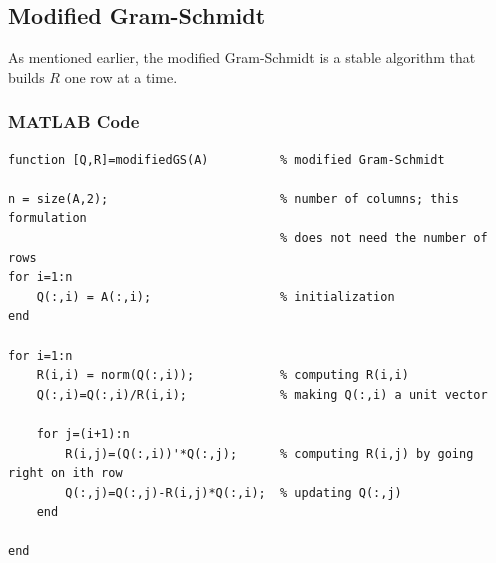 \documentclass[letterpaper]{article}
\begin{document}
\subsection{Modified Gram-Schmidt}
As mentioned earlier, the modified Gram-Schmidt is a stable algorithm that builds $R$ one row at a time. 

\subsubsection{MATLAB Code}
\begin{mdframed}
    \begin{verbatim}
function [Q,R]=modifiedGS(A)          % modified Gram-Schmidt

n = size(A,2);                        % number of columns; this formulation
                                      % does not need the number of rows
for i=1:n                             
    Q(:,i) = A(:,i);                  % initialization
end

for i=1:n
    R(i,i) = norm(Q(:,i));            % computing R(i,i) 
    Q(:,i)=Q(:,i)/R(i,i);             % making Q(:,i) a unit vector

    for j=(i+1):n
        R(i,j)=(Q(:,i))'*Q(:,j);      % computing R(i,j) by going right on ith row
        Q(:,j)=Q(:,j)-R(i,j)*Q(:,i);  % updating Q(:,j)
    end

end
    \end{verbatim}
\end{mdframed}
\end{document}
